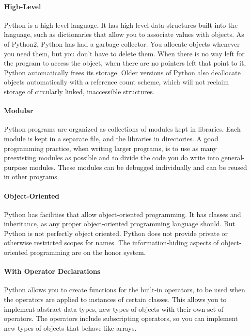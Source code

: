 \paragraph{High-Level}
Python is a high-level language. It
has high-level data structures built into the language, such as
dictionaries that allow you to associate values with objects. As of
Python2, Python has had a garbage collector. You allocate objects
whenever you need them, but you don't have to delete them. When there is
no way left for the program to access the object, when there are no
pointers left that point to it, Python automatically frees its storage.
Older versions of Python also deallocate objects automatically with a
reference count scheme, which will not reclaim storage of circularly
linked, inaccessible structures.

\paragraph{Modular}
Python programs are organized as
collections of modules kept in libraries. Each module is kept in a
separate file, and the libraries in directories. A good programming
practice, when writing larger programs, is to use as many preexisting
modules as possible and to divide the code you do write into
general-purpose modules. These modules can be debugged individually and
can be reused in other programs.

\paragraph{Object-Oriented}
Python has facilities that allow
object-oriented programming. It has classes and inheritance, as any
proper object-oriented programming language should. But Python is not
perfectly object oriented. Python does not provide private or otherwise
restricted scopes for names. The information-hiding aspects of
object-oriented programming are on the honor system.

\paragraph{With Operator Declarations}
Python allows you to create
functions for the built-in operators, to be used when the operators are
applied to instances of certain classes. This allows you to implement
abstract data types, new types of objects with their own set of
operators. The operators include subscripting operators, so you can
implement new types of objects that behave like arrays.

